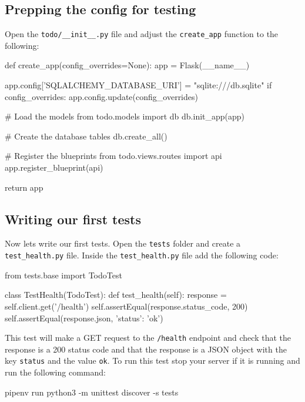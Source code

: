 \documentclass{csse4400}
\begin{document}
\subsection{Prepping the config for testing}

Open the \texttt{todo/\_\_init\_\_.py} file and adjust the \texttt{create\_app} function to the following:

\begin{code}[language=python,numbers=none]{}
  def create_app(config_overrides=None):
      app = Flask(__name__)

      app.config['SQLALCHEMY_DATABASE_URI'] = "sqlite:///db.sqlite"
      if config_overrides:
          app.config.update(config_overrides)

      # Load the models
      from todo.models import db
      db.init_app(app)

      # Create the database tables
      db.create_all()

      # Register the blueprints
      from todo.views.routes import api
      app.register_blueprint(api)

      return app
\end{code}

\subsection{Writing our first tests}

Now lets write our first tests. Open the \texttt{tests} folder and create a \texttt{test\_health.py} file. Inside the \texttt{test\_health.py} file add the following code:

\begin{code}[language=python,numbers=none]{}
  from tests.base import TodoTest
  
  
  class TestHealth(TodoTest):
      def test_health(self):
          response = self.client.get('/health')
          self.assertEqual(response.status_code, 200)
          self.assertEqual(response.json, {'status': 'ok'})

\end{code}

This test will make a GET request to the \texttt{/health} endpoint and check that the response is a 200 status code and that the response is a JSON object with the key \texttt{status} and the value \texttt{ok}. To run this test stop your server if it is running and run the following command:

\begin{code}[language=bash,numbers=none]{}
  pipenv run python3 -m unittest discover -s tests
\end{code}
\end{document}
